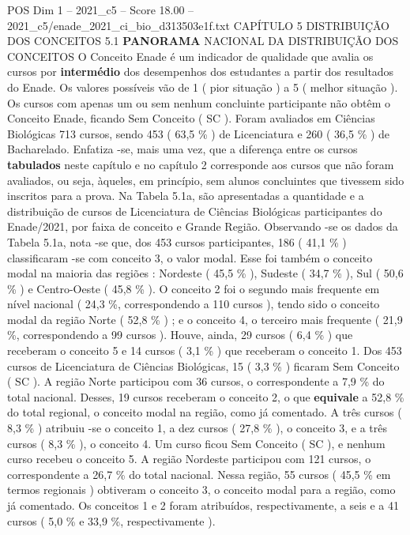 \begin{textsample}{POS Dim 1 – 2021\_c5 – Score 18.00 – 2021\_c5/enade\_2021\_ci\_bio\_d313503e1f.txt}  \label{ex:f1_pos_036}
CAPÍTULO 5 DISTRIBUIÇÃO DOS CONCEITOS 5.1 \textbf{PANORAMA} NACIONAL DA DISTRIBUIÇÃO DOS CONCEITOS O Conceito Enade é um indicador de qualidade que avalia os cursos por \textbf{intermédio} dos desempenhos dos estudantes a partir dos resultados do Enade.
Os valores possíveis vão de 1 ( pior situação ) a 5 ( melhor situação ).
Os cursos com apenas um ou sem nenhum concluinte participante não obtêm o Conceito Enade, ficando Sem Conceito ( SC ).
Foram avaliados em Ciências Biológicas 713 cursos, sendo 453 ( 63,5 \% ) de Licenciatura e 260 ( 36,5 \% ) de Bacharelado.
Enfatiza -se, mais uma vez, que a diferença entre os cursos \textbf{tabulados} neste capítulo e no capítulo 2 corresponde aos cursos que não foram avaliados, ou seja, àqueles, em princípio, sem alunos concluintes que tivessem sido inscritos para a prova.
Na Tabela 5.1a, são apresentadas a quantidade e a distribuição de cursos de Licenciatura de Ciências Biológicas participantes do Enade/2021, por faixa de conceito e Grande Região.
Observando -se os dados da Tabela 5.1a, nota -se que, dos 453 cursos participantes, 186 ( 41,1 \% ) classificaram -se com conceito 3, o valor modal.
Esse foi também o conceito modal na maioria das regiões : Nordeste ( 45,5 \% ), Sudeste ( 34,7 \% ), Sul ( 50,6 \% ) e Centro-Oeste ( 45,8 \% ).
O conceito 2 foi o segundo mais frequente em nível nacional ( 24,3 \%, correspondendo a 110 cursos ), tendo sido o conceito modal da região Norte ( 52,8 \% ) ; e o conceito 4, o terceiro mais frequente ( 21,9 \%, correspondendo a 99 cursos ).
Houve, ainda, 29 cursos ( 6,4 \% ) que receberam o conceito 5 e 14 cursos ( 3,1 \% ) que receberam o conceito 1.
Dos 453 cursos de Licenciatura de Ciências Biológicas, 15 ( 3,3 \% ) ficaram Sem Conceito ( SC ).
A região Norte participou com 36 cursos, o correspondente a 7,9 \% do total nacional.
Desses, 19 cursos receberam o conceito 2, o que \textbf{equivale} a 52,8 \% do total regional, o conceito modal na região, como já comentado.
A três cursos ( 8,3 \% ) atribuiu -se o conceito 1, a dez cursos ( 27,8 \% ), o conceito 3, e a três cursos ( 8,3 \% ), o conceito 4.
Um curso ficou Sem Conceito ( SC ), e nenhum curso recebeu o conceito 5.
A região Nordeste participou com 121 cursos, o correspondente a 26,7 \% do total nacional.
Nessa região, 55 cursos ( 45,5 \% em termos regionais ) obtiveram o conceito 3, o conceito modal para a região, como já comentado.
Os conceitos 1 e 2 foram atribuídos, respectivamente, a seis e a 41 cursos ( 5,0 \% e 33,9 \%, respectivamente ).

\end{textsample}
